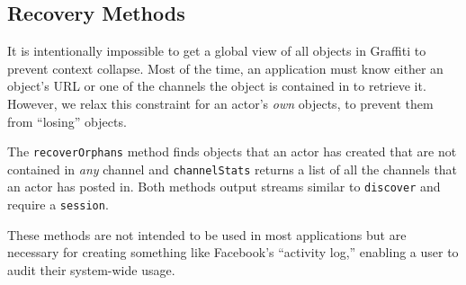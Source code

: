 



\subsection{Recovery Methods}

It is intentionally impossible to get a global view of all objects
in Graffiti to prevent context collapse. Most of the time,
an application must know either an object's URL or one of the channels
the object is contained in to retrieve it. However, we relax this
constraint for an actor's \emph{own} objects, to prevent them from
``losing'' objects.

The \texttt{recoverOrphans} method finds objects that an actor has created
that are not contained in \emph{any} channel and \texttt{channelStats}
returns a list of all the channels that an actor has posted in.
Both methods output streams similar to \texttt{discover}
and require a \texttt{session}.

These methods are not intended to be used in most applications but are
necessary for creating something like Facebook's ``activity log,''
enabling a user to audit their system-wide usage.

